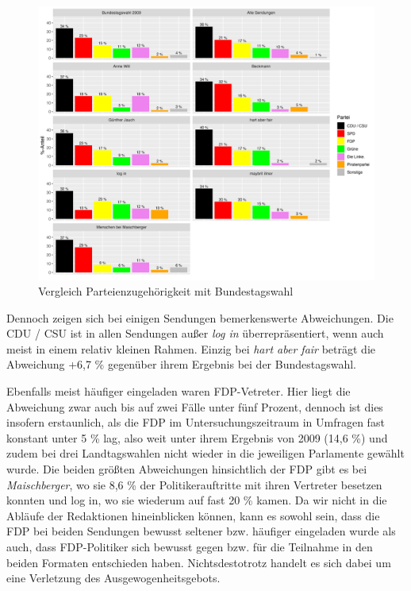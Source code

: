\begin{figure}[ht]
	\centering
	\includegraphics[width=1\textwidth]{daten/grafiken/plot_parteizugehoerigkeit.png}
	\caption{Vergleich Parteienzugehörigkeit mit Bundestagswahl}
	\label{plot:parteizugehoerigkeit}
\end{figure}

Dennoch zeigen sich bei einigen Sendungen bemerkenswerte Abweichungen. Die CDU / CSU ist in allen Sendungen außer \textit{log in} überrepräsentiert, wenn auch meist in einem relativ kleinen Rahmen. Einzig bei \textit{hart aber fair} beträgt die Abweichung +6,7 \% gegenüber ihrem Ergebnis bei der Bundestagswahl.

Ebenfalls meist häufiger eingeladen waren FDP-Vetreter. Hier liegt die Abweichung zwar auch bis auf zwei Fälle unter fünf Prozent, dennoch ist dies insofern erstaunlich, als die FDP im Untersuchungszeitraum in Umfragen fast konstant unter 5 \% lag, also weit unter ihrem Ergebnis von 2009 (14,6 \%) und zudem bei drei Landtagswahlen nicht wieder in die jeweiligen Parlamente gewählt wurde. Die beiden größten Abweichungen hinsichtlich der FDP gibt es bei \textit{Maischberger}, wo sie 8,6 \% der Politikerauftritte mit ihren Vertreter besetzen konnten und log in, wo sie wiederum auf fast 20 \% kamen. Da wir nicht in die Abläufe der Redaktionen hineinblicken können, kann es sowohl sein, dass die FDP bei beiden Sendungen bewusst seltener bzw. häufiger eingeladen wurde als auch, dass FDP-Politiker sich bewusst gegen bzw. für die Teilnahme in den beiden Formaten entschieden haben. Nichtsdestotrotz handelt es sich dabei um eine  Verletzung des Ausgewogenheitsgebots.

